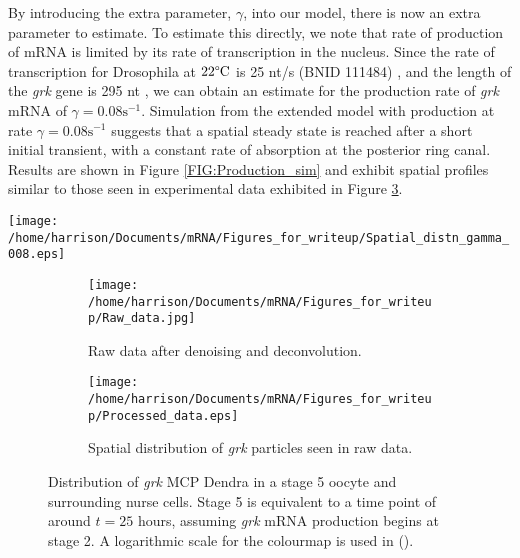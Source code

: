 \documentclass[twocolumn]{biophys}
\begin{document}
By introducing the extra parameter, $\gamma$, into our model, there is now an extra parameter to estimate. 
To estimate this directly, we note that rate of production of mRNA is limited by its rate of transcription in the nucleus.
Since the rate of transcription for Drosophila at $22 \degree \text{C}$ is 25 nt/s (BNID 111484) \citep{milo2010bionumbers}, and the length of the \textit{grk} gene is 295 nt \cite{marygold2013flybase}, we can obtain an estimate for the production rate of \textit{grk} mRNA of $\gamma = 0.08 \text{s}^{-1}$.
Simulation from the extended model with production at rate $\gamma=0.08 \text{s}^{-1}$ suggests that a spatial steady state is reached after a short initial transient, with a constant rate of absorption at the posterior ring canal.
Results are shown in Figure \ref{FIG:Production_sim} and exhibit spatial profiles similar to those seen in experimental data exhibited in Figure \ref{FIG:Raw_and_processed_data}.
\begin{figure*}
 \centering
 \texttt{[image: /home/harrison/Documents/mRNA/Figures\_for\_writeup/Spatial\_distn\_gamma\_008.eps]}
 \caption{\small The spatial distribution evolving over time up to 25 hours from a single simulation of the model with production included and parameters of $\phi=0.58$, $\nu_1=1.16 \mu \text{ms}^{-1}$, $\nu_2=0.8 \mu \text{ms}^{-1}$, $\omega_1=0.42 \text{s}^{-1}$, $\omega_2=0.84 \text{s}^{-1}$, $\lambda=0.11 \text{s}^{-1}$, $\gamma = 0.08 \text{s}^{-1}$. 
 A logarithmic scale for the colourmap is used to emphasise the presence of small numbers of particles in the nurse cell.}
 \label{FIG:Production_sim}
\end{figure*}

\begin{figure} 
        \centering
        \begin{subfigure}[h]{0.76\columnwidth}
                \texttt{[image: /home/harrison/Documents/mRNA/Figures\_for\_writeup/Raw\_data.jpg]}
                \caption{Raw data after denoising and deconvolution.}
                \label{fig:aa}
        \end{subfigure}%
        
        
        \begin{subfigure}[h]{0.86\columnwidth}
                \texttt{[image: /home/harrison/Documents/mRNA/Figures\_for\_writeup/Processed\_data.eps]}
                \caption{Spatial distribution of \textit{grk} particles seen in raw data.}
                \label{fig:bb}
        \end{subfigure}
        
        \caption{\small Distribution of \textit{grk} MCP Dendra in a stage 5  oocyte and surrounding nurse cells. Stage 5 is equivalent to a time point of around $t=25$ hours, assuming \textit{grk} mRNA production begins at stage 2. A logarithmic scale for the colourmap is used in ().}
        \label{FIG:Raw_and_processed_data}
\end{figure}
\end{document}
